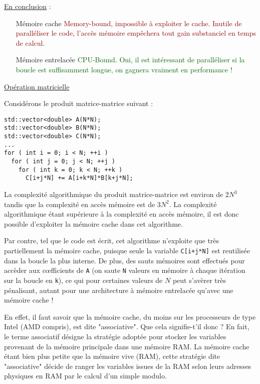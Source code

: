 \documentclass[fleqn,11pt]{article}
\begin{document}
\underline{En conclusion} :
\begin{itemize}
\item [Mémoire cache] \textcolor{darkred}{Memory-bound, impossible à exploiter le cache}. \textcolor{darkred}{Inutile de paralléliser le code, l'accès mémoire empêchera tout gain substanciel en temps de calcul}.
\item [Mémoire entrelacée] \textcolor{darkgreen}{CPU-Bound}. \textcolor{darkgreen}{Oui, il est intéressant de paralléliser si la boucle est suffisamment longue, on gagnera vraiment en performance !}
\end{itemize}

\underline{Opération matricielle}

Considérons le produit matrice-matrice suivant :

\begin{lstlisting}
std::vector<double> A(N*N);
std::vector<double> B(N*N);
std::vector<double> C(N*N);
...
for ( int i = 0; i < N; ++i )
  for ( int j = 0; j < N; ++j )
    for ( int k = 0; k < N; ++k )
      C[i+j*N] += A[i+k*N]*B[k+j*N];
\end{lstlisting}

La complexité algorithmique du produit matrice-matrice est environ de $2N^{3}$ tandis que la complexité en accès
mémoire est de $3N^{2}$. La complexité algorithmique étant supérieure à la complexité en accès mémoire, il est donc possible d'exploiter la mémoire cache dans cet algorithme.

Par contre, tel que le code est écrit, cet algorithme n'exploite que très partiellement la mémoire cache,
puisque seule la variable \texttt{C[i+j*N]} est reutilisée dans la boucle la plus interne. De plus, des sauts
mémoires sont effectués pour accèder aux c{\oe}fficients de \texttt{A} (on saute \texttt{N} valeurs en mémoire à chaque itération sur la boucle en \texttt{k}), ce qui pour certaines valeurs de $N$ peut s'avèrer très pénalisant, autant pour une architecture à mémoire entrelacée qu'avec une mémoire cache !

En effet, il faut savoir que la mémoire cache, du moins sur les processeurs de type Intel (AMD compris),
 est dite "associative". Que cela signifie-t'il donc ? En fait, le terme associatif
désigne la stratégie adoptée pour stocker les variables provenant de la mémoire principale dans une mémoire RAM. La mémoire cache étant bien plus petite que la mémoire vive (RAM), cette stratégie dite "associative"
décide de ranger les variables issues de la RAM selon leurs adresses physiques en RAM par le calcul d'un simple modulo.
\end{document}
